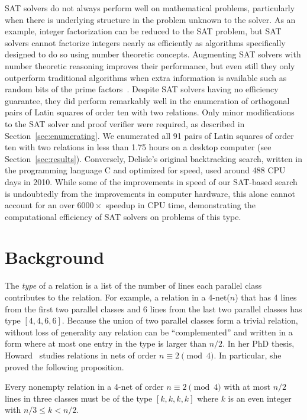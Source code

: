 \documentclass[runningheads]{llncs}
\begin{document}
SAT solvers do not always perform well on mathematical problems, particularly
when there is underlying structure in the problem unknown to the solver.  As an example,
integer factorization can be reduced to the SAT problem, but
SAT solvers cannot factorize integers nearly as efficiently
as algorithms specifically designed to do so using number theoretic concepts.
Augmenting SAT solvers with number theoretic reasoning improves their performance,
but even still they only outperform traditional algorithms when extra information is available
such as random bits of the prime factors~\cite{Ajani2024}.
Despite SAT solvers having no efficiency guarantee,
they did perform remarkably well in the enumeration of orthogonal pairs of Latin squares of order ten with two relations.
Only minor modifications to the SAT solver and proof verifier were required, as described in Section~\ref{sec:enumerating}.
We enumerated all 91 pairs of Latin squares of order ten with two relations in less than 1.75 hours on a desktop computer (see Section~\ref{sec:results}).
Conversely, Delisle's original backtracking search, written in the programming language C and optimized for speed, used around 488 CPU days in 2010.
While some of the improvements in speed of our SAT-based search is undoubtedly from the improvements in computer hardware,
this alone cannot account for an over $6000\times$ speedup in CPU time, demonstrating the computational efficiency of SAT solvers on problems of this type.

\section{Background}\label{sec:background}

The \emph{type} of a relation is a list of the number of lines each parallel class contributes
to the relation.  For example, a relation in a 4-net($n$) that has 4 lines from the first two
parallel classes and 6 lines from the last two parallel classes has type $[4,4,6,6]$.
Because the union of two parallel classes form a trivial relation, without loss of generality
any relation can be ``complemented'' and written in a form where at most one entry
in the type is larger than $n/2$.
In her PhD thesis, Howard~\cite{howardthesis} studies relations in nets of order $n\equiv 2\pmod{4}$.
In particular, she proved the following proposition.

\begin{proposition}\label{prop4netrel}
Every nonempty relation in a 4-net of order $n\equiv2\pmod4$ with at most $n/2$ lines
in three classes must be of the type
$[k,k,k,k]$ where $k$ is an even integer with $n/3\leq k<n/2$.
\end{proposition}
\end{document}
